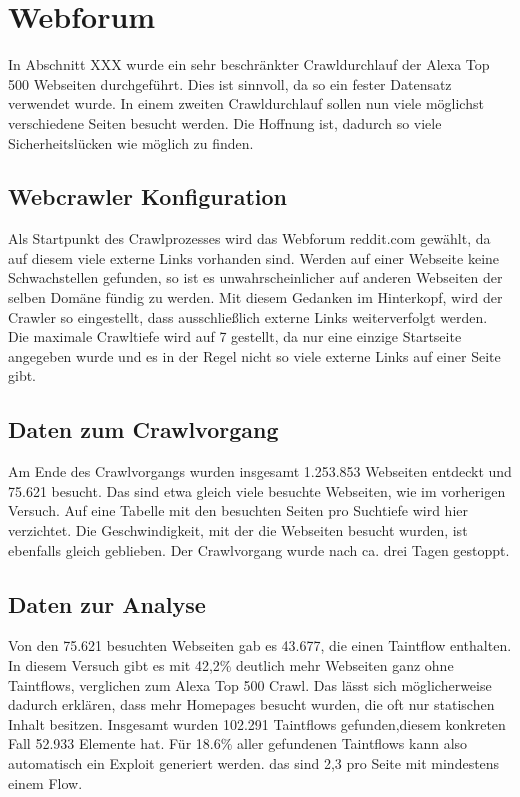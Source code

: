 \section{Webforum}
In Abschnitt XXX wurde ein sehr beschränkter Crawldurchlauf der Alexa Top 500 Webseiten durchgeführt. Dies ist sinnvoll, da so ein fester Datensatz verwendet wurde. In einem zweiten Crawldurchlauf sollen nun viele möglichst verschiedene Seiten besucht werden. Die Hoffnung ist, dadurch so viele Sicherheitslücken wie möglich zu finden.
\subsection{Webcrawler Konfiguration}
Als Startpunkt des Crawlprozesses wird das Webforum reddit.com gewählt, da auf diesem viele externe Links vorhanden sind. Werden auf einer Webseite keine Schwachstellen gefunden, so ist es unwahrscheinlicher auf anderen Webseiten der selben Domäne fündig zu werden. Mit diesem Gedanken im Hinterkopf, wird der Crawler so eingestellt, dass ausschließlich externe Links weiterverfolgt werden. \\
Die maximale Crawltiefe wird auf 7 gestellt, da nur eine einzige Startseite angegeben wurde und es in der Regel nicht so viele externe Links auf einer Seite gibt.
\subsection{Daten zum Crawlvorgang}
Am Ende des Crawlvorgangs wurden insgesamt 1.253.853 Webseiten entdeckt und 75.621 besucht. Das sind etwa gleich viele besuchte Webseiten, wie im vorherigen Versuch. Auf eine Tabelle mit den besuchten Seiten pro Suchtiefe wird hier verzichtet. Die Geschwindigkeit, mit der die Webseiten besucht wurden, ist ebenfalls gleich geblieben. Der Crawlvorgang wurde nach ca. drei Tagen gestoppt.
\subsection{Daten zur Analyse}
Von den 75.621 besuchten Webseiten gab es 43.677, die einen Taintflow enthalten. In diesem Versuch gibt es mit  42,2\% deutlich mehr Webseiten ganz ohne Taintflows, verglichen zum Alexa Top 500 Crawl. Das lässt sich möglicherweise dadurch erklären, dass mehr Homepages besucht wurden, die oft nur statischen Inhalt besitzen. Insgesamt wurden 102.291 Taintflows gefunden,diesem konkreten Fall 52.933 Elemente hat. Für 18.6\% aller gefundenen Taintflows kann also automatisch ein Exploit generiert werden.  das sind 2,3 pro Seite mit mindestens einem Flow. 

